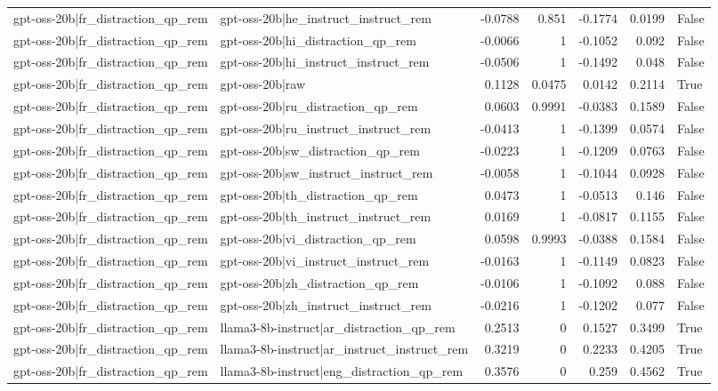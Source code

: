 \begin{table}
\begin{tabular}{l l r r r r l}
gpt-oss-20b|fr_distraction_qp_rem & gpt-oss-20b|he_instruct_instruct_rem & -0.0788 & 0.851 & -0.1774 & 0.0199 & False \\
gpt-oss-20b|fr_distraction_qp_rem & gpt-oss-20b|hi_distraction_qp_rem & -0.0066 & 1 & -0.1052 & 0.092 & False \\
gpt-oss-20b|fr_distraction_qp_rem & gpt-oss-20b|hi_instruct_instruct_rem & -0.0506 & 1 & -0.1492 & 0.048 & False \\
gpt-oss-20b|fr_distraction_qp_rem & gpt-oss-20b|raw & 0.1128 & 0.0475 & 0.0142 & 0.2114 & True \\
gpt-oss-20b|fr_distraction_qp_rem & gpt-oss-20b|ru_distraction_qp_rem & 0.0603 & 0.9991 & -0.0383 & 0.1589 & False \\
gpt-oss-20b|fr_distraction_qp_rem & gpt-oss-20b|ru_instruct_instruct_rem & -0.0413 & 1 & -0.1399 & 0.0574 & False \\
gpt-oss-20b|fr_distraction_qp_rem & gpt-oss-20b|sw_distraction_qp_rem & -0.0223 & 1 & -0.1209 & 0.0763 & False \\
gpt-oss-20b|fr_distraction_qp_rem & gpt-oss-20b|sw_instruct_instruct_rem & -0.0058 & 1 & -0.1044 & 0.0928 & False \\
gpt-oss-20b|fr_distraction_qp_rem & gpt-oss-20b|th_distraction_qp_rem & 0.0473 & 1 & -0.0513 & 0.146 & False \\
gpt-oss-20b|fr_distraction_qp_rem & gpt-oss-20b|th_instruct_instruct_rem & 0.0169 & 1 & -0.0817 & 0.1155 & False \\
gpt-oss-20b|fr_distraction_qp_rem & gpt-oss-20b|vi_distraction_qp_rem & 0.0598 & 0.9993 & -0.0388 & 0.1584 & False \\
gpt-oss-20b|fr_distraction_qp_rem & gpt-oss-20b|vi_instruct_instruct_rem & -0.0163 & 1 & -0.1149 & 0.0823 & False \\
gpt-oss-20b|fr_distraction_qp_rem & gpt-oss-20b|zh_distraction_qp_rem & -0.0106 & 1 & -0.1092 & 0.088 & False \\
gpt-oss-20b|fr_distraction_qp_rem & gpt-oss-20b|zh_instruct_instruct_rem & -0.0216 & 1 & -0.1202 & 0.077 & False \\
gpt-oss-20b|fr_distraction_qp_rem & llama3-8b-instruct|ar_distraction_qp_rem & 0.2513 & 0 & 0.1527 & 0.3499 & True \\
gpt-oss-20b|fr_distraction_qp_rem & llama3-8b-instruct|ar_instruct_instruct_rem & 0.3219 & 0 & 0.2233 & 0.4205 & True \\
gpt-oss-20b|fr_distraction_qp_rem & llama3-8b-instruct|eng_distraction_qp_rem & 0.3576 & 0 & 0.259 & 0.4562 & True \\

\end{tabular}
\end{table}
